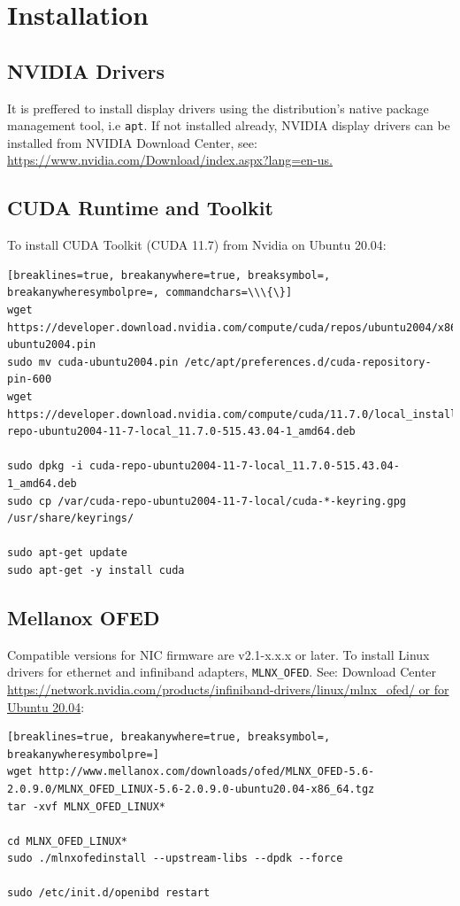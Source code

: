 \documentclass[a4paper,onecolumn]{article}
\begin{document}
\section{Installation}

\subsection{NVIDIA Drivers}
It is preffered to install display drivers using the distribution's native package management tool, i.e \verb|apt|. If not installed already, NVIDIA display drivers can be installed from NVIDIA Download Center, see: \url{https://www.nvidia.com/Download/index.aspx?lang=en-us.}

\subsection{CUDA Runtime and Toolkit}
To install CUDA Toolkit (CUDA 11.7) from Nvidia on Ubuntu 20.04:

\begin{Verbatim}[breaklines=true, breakanywhere=true, breaksymbol=, breakanywheresymbolpre=, commandchars=\\\{\}]
wget https://developer.download.nvidia.com/compute/cuda/repos/ubuntu2004/x86_64/cuda-ubuntu2004.pin
sudo mv cuda-ubuntu2004.pin /etc/apt/preferences.d/cuda-repository-pin-600
wget https://developer.download.nvidia.com/compute/cuda/11.7.0/local_installers/cuda-repo-ubuntu2004-11-7-local_11.7.0-515.43.04-1_amd64.deb

sudo dpkg -i cuda-repo-ubuntu2004-11-7-local_11.7.0-515.43.04-1_amd64.deb
sudo cp /var/cuda-repo-ubuntu2004-11-7-local/cuda-*-keyring.gpg /usr/share/keyrings/

sudo apt-get update
sudo apt-get -y install cuda
\end{Verbatim}

\subsection{Mellanox OFED}
Compatible versions for NIC firmware are v2.1-x.x.x or later. To install Linux drivers for ethernet
and infiniband adapters, \verb|MLNX_OFED|. See: Download Center \url{https://network.nvidia.com/products/infiniband-drivers/linux/mlnx\_ofed/ or for Ubuntu 20.04}:

\begin{Verbatim}[breaklines=true, breakanywhere=true, breaksymbol=, breakanywheresymbolpre=]
wget http://www.mellanox.com/downloads/ofed/MLNX_OFED-5.6-2.0.9.0/MLNX_OFED_LINUX-5.6-2.0.9.0-ubuntu20.04-x86_64.tgz
tar -xvf MLNX_OFED_LINUX*

cd MLNX_OFED_LINUX*
sudo ./mlnxofedinstall --upstream-libs --dpdk --force

sudo /etc/init.d/openibd restart
\end{Verbatim}
\end{document}
